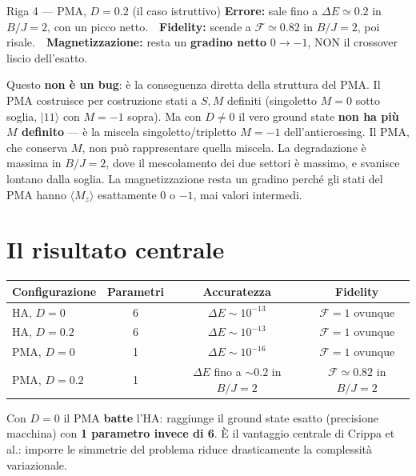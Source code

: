 \documentclass[11pt,a4paper]{article}
\begin{document}
\begin{warnbox}{Riga 4 --- PMA, $D=0.2$ (il caso istruttivo)}
\textbf{Errore:} sale fino a $\Delta E\simeq0.2$ in $B/J=2$, con un
picco netto.\ \ \textbf{Fidelity:} scende a $\mathcal F\simeq0.82$ in
$B/J=2$, poi risale.\ \ \textbf{Magnetizzazione:} resta un
\textbf{gradino netto} $0\to-1$, NON il crossover liscio dell'esatto.

Questo \textbf{non è un bug}: è la conseguenza diretta della struttura
del PMA. Il PMA costruisce per costruzione stati a $S,M$ definiti
(singoletto $M=0$ sotto soglia, $|11\rangle$ con $M=-1$ sopra). Ma con
$D\neq0$ il vero ground state \textbf{non ha più $M$ definito} --- è la
miscela singoletto/tripletto $M=-1$ dell'anticrossing. Il PMA, che
conserva $M$, non può rappresentare quella miscela. La degradazione è
massima in $B/J=2$, dove il mescolamento dei due settori è massimo, e
svanisce lontano dalla soglia. La magnetizzazione resta un gradino
perché gli stati del PMA hanno $\langle M_z\rangle$ esattamente $0$ o
$-1$, mai valori intermedi.
\end{warnbox}

\section*{Il risultato centrale}

\begin{center}
\renewcommand{\arraystretch}{1.3}
\begin{tabular}{@{}lccc@{}}
\toprule
\rowcolor{inkblue!10}
\textbf{Configurazione} & \textbf{Parametri} & \textbf{Accuratezza} & \textbf{Fidelity}\\
\midrule
HA, $D=0$   & 6 & $\Delta E\sim10^{-13}$ & $\mathcal F=1$ ovunque\\
HA, $D=0.2$ & 6 & $\Delta E\sim10^{-13}$ & $\mathcal F=1$ ovunque\\
PMA, $D=0$  & 1 & $\Delta E\sim10^{-16}$ & $\mathcal F=1$ ovunque\\
PMA, $D=0.2$& 1 & $\Delta E$ fino a $\sim0.2$ in $B/J{=}2$ & $\mathcal F\simeq0.82$ in $B/J{=}2$\\
\bottomrule
\end{tabular}
\end{center}

Con $D=0$ il PMA \textbf{batte} l'HA: raggiunge il ground state esatto
(precisione macchina) con \textbf{1 parametro invece di 6}. È il
vantaggio centrale di Crippa et al.: imporre le simmetrie del problema
riduce drasticamente la complessità variazionale.
\end{document}
